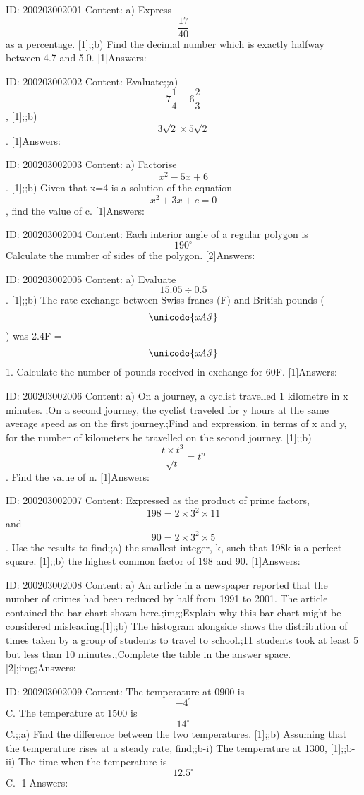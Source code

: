 \documentclass{article}
\begin{document}
ID: 200203002001
Content:
a) Express $$\frac{17}{40}$$ as a percentage.   [1];;b) Find the decimal number which is exactly halfway between 4.7 and 5.0.   [1]Answers:

ID: 200203002002
Content:
Evaluate;;a) $$7 \frac{1}{4} - 6 \frac{2}{3}$$,   [1];;b) $$3 \sqrt{2} \times 5 \sqrt{2}$$.   [1]Answers:

ID: 200203002003
Content:
a) Factorise $$x^2 - 5x + 6$$.   [1];;b) Given that x=4 is a solution of the equation $$x^2 + 3x + c = 0$$, find the value of c.   [1]Answers:

ID: 200203002004
Content:
Each interior angle of a regular polygon is $$190^{\circ}$$ Calculate the number of sides of the polygon.   [2]Answers:

ID: 200203002005
Content:
a) Evaluate $$15.05 \div 0.5$$.   [1];;b) The rate exchange between Swiss francs (F) and British pounds ($$\it\unicode{xA3}$$) was 2.4F = $$\it\unicode{xA3}$$1. Calculate the number of pounds received in exchange for 60F.   [1]Answers:

ID: 200203002006
Content:
a) On a journey, a cyclist travelled 1 kilometre in x minutes. ;On a second journey, the cyclist traveled for y hours at the same average speed as on the first journey.;Find and expression, in terms of x and y, for the number of kilometers he travelled on the second journey.   [1];;b) $$\frac{t \times t^{3}}{\sqrt{t}} = t^{n}$$. Find the value of n.   [1]Answers:

ID: 200203002007
Content:
Expressed as the product of prime factors, $$198 = 2 \times 3^2 \times 11$$ and $$90 = 2 \times 3^2 \times 5$$. Use the results to find;;a) the smallest integer, k, such that 198k is a perfect square.   [1];;b) the highest common factor of 198 and 90.   [1]Answers:

ID: 200203002008
Content:
a) An article in a newspaper reported that the number of crimes had been reduced by half from 1991 to 2001. The article contained the bar chart shown here.;img;Explain why this bar chart might be considered misleading.[1];;b) The histogram alongside shows the distribution of times taken by a group of students to travel to school.;11 students took at least 5 but less than 10 minutes.;Complete the table in the answer space.   [2];img;Answers:

ID: 200203002009
Content:
The temperature at 0900 is $$-4^{\circ}$$C. The temperature at 1500 is $$14^{\circ}$$C.;;a) Find the difference between the two temperatures.   [1];;b) Assuming that the temperature rises at a steady rate, find;;b-i) The temperature at 1300,   [1];;b-ii) The time when the temperature is $$12.5^{\circ}$$C.   [1]Answers:
\end{document}
